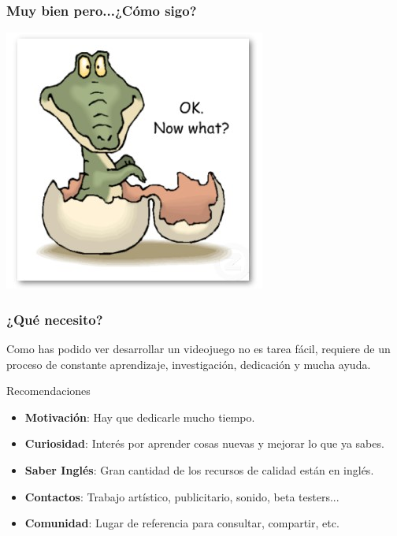 

\begin{frame}
	\frametitle{Muy bien pero...¿Cómo sigo?}
	
	\begin{center}
		\includegraphics[scale=0.40]{img/nowwhat.jpg}
	\end{center}

\end{frame}


\begin{frame}
	\frametitle{¿Qué necesito?}
	
	Como has podido ver desarrollar un videojuego no es tarea fácil, requiere de un proceso de constante aprendizaje, investigación, dedicación y mucha ayuda.
		
	\begin{block}{Recomendaciones}
		\begin{itemize}
			\item \textbf{Motivación}: Hay que dedicarle mucho tiempo.
			\item \textbf{Curiosidad}: Interés por aprender cosas nuevas y mejorar lo que ya sabes.
			\item \textbf{Saber Inglés}: Gran cantidad de los recursos de calidad están en inglés.
			\item \textbf{Contactos}: Trabajo artístico, publicitario, sonido, beta testers...
			\item \textbf{Comunidad}: Lugar de referencia para consultar, compartir, etc.
		\end{itemize}
	\end{block}

\end{frame}

